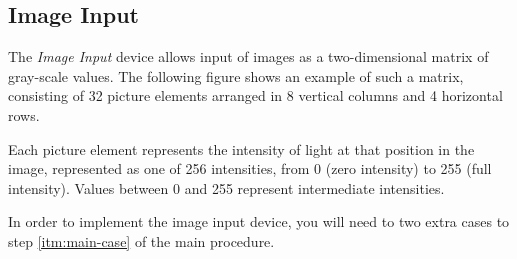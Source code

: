 \documentclass[a4paper,11pt]{article}
\begin{document}
\subsection{Image Input}

The \emph{Image Input} device allows input of images as a two-dimensional matrix of gray-scale values.
The following figure shows an example of such a matrix, consisting of 32 picture elements arranged in 8 vertical columns and 4 horizontal rows.
\begin{center}
\end{center}
Each picture element represents the intensity of light at that position in the image, represented as one of 256 intensities, from 0 (zero intensity) to 255 (full intensity).
Values between 0 and 255 represent intermediate intensities.

In order to implement the image input device, you will need to two extra cases to step \ref{itm:main-case} of the main procedure.
\end{document}
